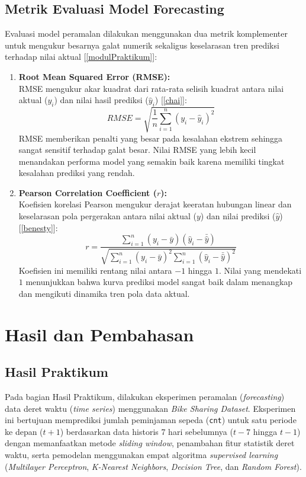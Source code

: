 \section{Metrik Evaluasi Model Forecasting}
Evaluasi model peramalan dilakukan menggunakan dua metrik komplementer untuk mengukur besarnya galat numerik sekaligus keselarasan tren prediksi terhadap nilai aktual [\ref{modulPraktikum}]:
\begin{enumerate}
    \item \textbf{Root Mean Squared Error (RMSE):}\\
    RMSE mengukur akar kuadrat dari rata-rata selisih kuadrat antara nilai aktual ($y_{i}$) dan nilai hasil prediksi ($\hat{y}_{i}$) [\ref{chai}]:
    \begin{equation}
        RMSE = \sqrt{\frac{1}{n}\sum_{i=1}^{n}\left(y_{i} - \hat{y}_{i}\right)^2}
    \end{equation}
    RMSE memberikan penalti yang besar pada kesalahan ekstrem sehingga sangat sensitif terhadap galat besar. Nilai RMSE yang lebih kecil menandakan performa model yang semakin baik karena memiliki tingkat kesalahan prediksi yang rendah.

    \item \textbf{Pearson Correlation Coefficient ($r$):}\\
    Koefisien korelasi Pearson mengukur derajat keeratan hubungan linear dan keselarasan pola pergerakan antara nilai aktual ($y$) dan nilai prediksi ($\hat{y}$) [\ref{benesty}]:
    \begin{equation}
        r = \frac{\sum_{i=1}^{n}(y_{i} - \bar{y})(\hat{y}_{i} - \bar{\hat{y}})}{\sqrt{\sum_{i=1}^{n}(y_{i} - \bar{y})^2 \sum_{i=1}^{n}(\hat{y}_{i} - \bar{\hat{y}})^2}}
    \end{equation}
    Koefisien ini memiliki rentang nilai antara $-1$ hingga $1$. Nilai yang mendekati $1$ menunjukkan bahwa kurva prediksi model sangat baik dalam menangkap dan mengikuti dinamika tren pola data aktual.
\end{enumerate}

\chapter{Hasil dan Pembahasan}

\section{Hasil Praktikum}
Pada bagian Hasil Praktikum, dilakukan eksperimen peramalan (\textit{forecasting}) data deret waktu (\textit{time series}) menggunakan \textit{Bike Sharing Dataset}. Eksperimen ini bertujuan memprediksi jumlah peminjaman sepeda (\texttt{cnt}) untuk satu periode ke depan ($t+1$) berdasarkan data historis 7 hari sebelumnya ($t-7$ hingga $t-1$) dengan memanfaatkan metode \textit{sliding window}, penambahan fitur statistik deret waktu, serta pemodelan menggunakan empat algoritma \textit{supervised learning} (\textit{Multilayer Perceptron}, \textit{K-Nearest Neighbors}, \textit{Decision Tree}, dan \textit{Random Forest}).

